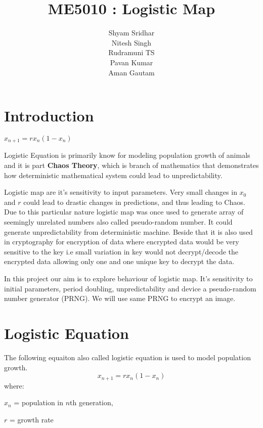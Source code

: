 \documentclass{report}
\title{\textbf{ME5010 : Logistic Map}}
\begin{document}
\author{Shyam Sridhar\\ Nitesh Singh \\ Rudramuni TS \\ Pavan Kumar \\ Aman Gautam }
\maketitle

\section{Introduction}

\begin{center}$x_{n+1} = rx_n(1-x_n)$\end{center}
Logistic Equation is primarily know for modeling population growth of animals and it is part \textbf{Chaos Theory}, which is branch of mathematics that demonstrates how deterministic mathematical system could lead to unpredictability.

Logistic map are it's sensitivity to input parameters. Very small changes in $x_0$ and $r$ could lead to drastic changes in predictions, and thus leading to Chaos. Due to this particular nature logistic map was once used to generate array of seemingly unrelated numbers also called pseudo-random number. It could generate unpredictability from deterministic machine. Beside that it is also used in cryptography for encryption of data where encrypted data would be very sensitive to the key i.e small variation in key would not decrypt/decode the encrypted data allowing only one and one unique key to decrypt the data.

In this project our aim is to explore behaviour of logistic map. It's sensitivity to initial parameters, period doubling, unpredictability and device a pseudo-random number generator (PRNG). We will use same PRNG to encrypt an image.



\newpage
\section{Logistic Equation}

The following equaiton also called logistic equation is used to model population growth.
\begin{equation}
x_{n+1} = rx_n(1-x_n)
\end{equation}
where:

$x_n$ = population in $n$th generation,

$r$ = growth rate
\end{document}
